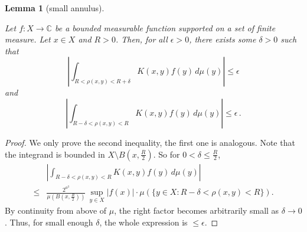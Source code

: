 \documentclass[10pt,a4paper]{article}
\theoremstyle{plain}
\newtheorem{lemma}[theorem]{Lemma}
\theoremstyle{definition}
\numberwithin{equation}{subsection}
\newcommand{\lean}[1]{}
\newcommand{\leanok}{}
\def\C{\mathbb{C}}
\begin{document}
\begin{lemma}[small annulus] \label{small-annulus}
    \leanok
    \lean{small_annulus_right, small_annulus_left}
    Let $f:X\to\C$ be a bounded measurable function supported on a set of finite measure.
    Let $x\in X$ and $R>0$.
    Then, for all $\epsilon>0$, there exists some $\delta>0$ such that
    \begin{equation}
        \left| \int_{R<\rho(x,y)<R+\delta} K(x,y) f(y) \, d\mu(y) \right| \le \epsilon
    \end{equation}
    and
    \begin{equation}
        \left| \int_{R-\delta<\rho(x,y)<R} K(x,y) f(y) \, d\mu(y) \right| \le \epsilon \,.
    \end{equation}
\end{lemma}
\begin{proof}
\leanok
We only prove the second inequality, the first one is analogous.
Note that the integrand is bounded in $X\setminus B(x,\frac{R}{2})$. So for $0<\delta\le\frac{R}{2}$,
\begin{align*}
    &\left| \int_{R-\delta<\rho(x,y)<R} K(x,y) f(y) \, d\mu(y) \right| \\
    \le &\frac{2^{a^3}}{\mu(B(x,\frac{R}{2}))} \, \sup_{y\in X}|f(x)| \cdot \mu(\{y\in X: R-\delta<\rho(x,y)<R\}).
\end{align*}
By continuity from above of $\mu$, the right factor becomes arbitrarily small as $\delta\rightarrow 0$. Thus, for small enough $\delta$, the whole expression is $\le\epsilon$.
\end{proof}
\end{document}

